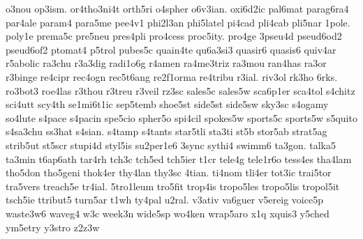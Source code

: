 o3nou
op3ism.
or4tho3ni4t
orth5ri
o4spher
o6v3ian.
oxi6d2ic
pal6mat
parag6ra4
par4ale
param4
para5me
pee4v1
phi2l3an
phi5latel
pi4cad
pli4cab
pli5nar
1pole.
poly1e
prema5c
pre5neu
pres4pli
pro4cess
proc5ity.
pro4ge
3pseu4d
pseud6od2
pseud6of2
ptomat4
p5trol
pubes5c
quain4te
qu6a3si3
quasir6
quasis6
quiv4ar
r5abolic
ra3chu
r3a3dig
radi1o6g
r4amen
ra4me3triz
ra3mou
ran4has
ra3or
r3binge
re4cipr
rec4ogn
rec5t6ang
re2f1orma
re4tribu
r3ial.
riv3ol
rk3ho
6rks.
ro3bot3
roe4las
r3thou
r3treu
r3veil
rz3sc
sales5c
sales5w
sca6p1er
sca4tol
s4chitz
sci4utt
scy4th
se1mi6t1ic
sep5temb
shoe5st
side5st
side5sw
sky3sc
s4ogamy
so4lute
s4pace
s4pacin
spe5cio
spher5o
spi4cil
spokes5w
sports5c
sports5w
s5quito
s4sa3chu
ss3hat
s4sian.
s4tamp
s4tants
star5tli
sta3ti
st5b
stor5ab
strat5ag
strib5ut
st5scr
stupi4d
styl5is
su2per1e6
3sync
sythi4
swimm6
ta3gon.
talka5
ta3min
t6ap6ath
tar4rh
tch3c
tch5ed
tch5ier
t1cr
tele4g
tele1r6o
tess4es
tha4lam
tho5don
tho5geni
thok4er
thy4lan
thy3sc
4tian.
ti4nom
tli4er
tot3ic
trai5tor
tra5vers
treach5e
tr4ial.
5tro1leum
tro5fit
trop4is
tropo5les
tropo5lis
tropol5it
tsch5ie
ttribut5
turn5ar
t1wh
ty4pal
u2ral.
v3ativ
va6guer
v5ereig
voice5p
waste3w6
waveg4
w3c
week3n
wide5sp
wo4ken
wrap5aro
x1q
xquis3
y5ched
ym5etry
y3stro
z2z3w

